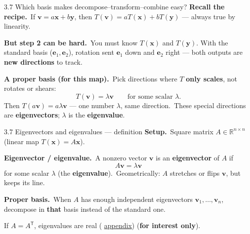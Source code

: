 \documentclass[11pt,aspectratio=169]{beamer}
\newcommand{\InterestOnly}{\textcolor{mAccent}{\textbf{for interest only}}}
\newcommand{\AppendixLink}[1]{%
  \hyperlink{#1}{\textcolor{mAccent}{appendix}}}
\begin{document}
\begin{frame}{3.7 Which basis makes decompose--transform--combine easy?}
  \footnotesize
  \textbf{Recall the recipe.}\
  If $\mathbf{v}=a\mathbf{x}+b\mathbf{y}$, then
  $T(\mathbf{v})=aT(\mathbf{x})+bT(\mathbf{y})$ --- always true by linearity.

  \medskip
  \textbf{But step 2 can be hard.}\
  You must know $T(\mathbf{x})$ and $T(\mathbf{y})$. With the standard basis
  ($\mathbf{e}_1,\mathbf{e}_2$), rotation sent $\mathbf{e}_1$ down and $\mathbf{e}_2$ right ---
  both outputs are \textbf{new directions} to track.

  \medskip
  \textbf{A proper basis (for this map).}\
  Pick directions where $T$ \textbf{only scales}, not rotates or shears:
  \[
    T(\mathbf{v})=\lambda\mathbf{v}
    \qquad\text{for some scalar $\lambda$.}
  \]
  Then $T(a\mathbf{v})=a\lambda\mathbf{v}$ --- one number $\lambda$, same direction.\
  These special directions are \textbf{eigenvectors}; $\lambda$ is the \textbf{eigenvalue}.
\end{frame}

\begin{frame}{3.7 Eigenvectors and eigenvalues --- definition}
  \footnotesize
  \textbf{Setup.}\
  Square matrix $A\in\mathbb{R}^{n\times n}$ (linear map $T(\mathbf{x})=A\mathbf{x}$).

  \medskip
  \textbf{Eigenvector / eigenvalue.}\
  A nonzero vector $\mathbf{v}$ is an \textbf{eigenvector} of $A$ if
  \[
    A\mathbf{v}=\lambda\mathbf{v}
  \]
  for some scalar $\lambda$ (the \textbf{eigenvalue}).\
  Geometrically: $A$ stretches or flips $\mathbf{v}$, but keeps its line.

  \medskip
  \textbf{Proper basis.}\
  When $A$ has enough independent eigenvectors
  $\mathbf{v}_1,\ldots,\mathbf{v}_n$, decompose in \textbf{that} basis instead of the standard one.

  \medskip
  {\scriptsize If $A=A^{\mathsf T}$, eigenvalues are real (\AppendixLink{sec:symmetric-real-eigenvalues}) (\InterestOnly).}
\end{frame}
\end{document}
